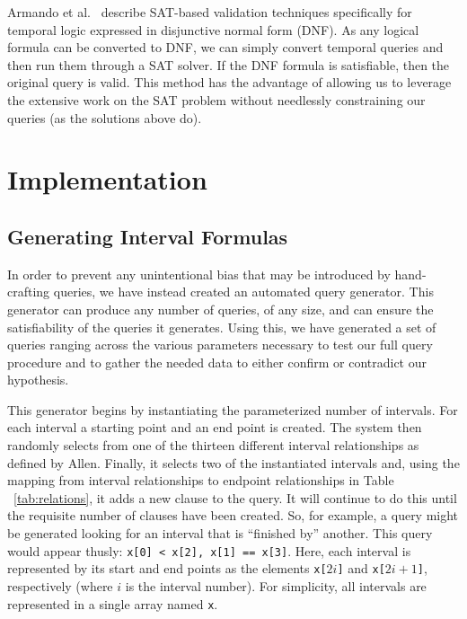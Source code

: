 \documentclass{achemso}
\begin{document}
Armando et al.~\cite{Armando:1999} describe SAT-based validation techniques specifically for temporal logic expressed in disjunctive normal form (DNF). As any logical formula can be converted to DNF, we can simply convert temporal queries and then run them through a SAT solver. If the DNF formula is satisfiable, then the original query is valid. This method has the advantage of allowing us to leverage the extensive work on the SAT problem without needlessly constraining our queries (as the solutions above do).  
\section{Implementation}
\subsection{Generating Interval Formulas}
In order to prevent any unintentional bias that may be introduced by hand-crafting queries, we have instead created an automated query generator.  This generator can produce any number of queries, of any size, and can ensure the satisfiability of the queries it generates.  Using this, we have generated a set of queries ranging across the various parameters necessary to test our full query procedure and to gather the needed data to either confirm or contradict our hypothesis.

This generator begins by instantiating the parameterized number of intervals.  For each interval a starting point and an end point is created.  The system then randomly selects from one of the thirteen different interval relationships as defined by Allen.  Finally, it selects two of the instantiated intervals and, using the mapping from interval relationships to endpoint relationships in Table ~\ref{tab:relations}, it adds a new clause to the query.  It will continue to do this until the requisite number of clauses have been created.  So, for example, a query might be generated looking for an interval that is ``finished by'' another.  This query would appear thusly:  \texttt{x[0] < x[2], x[1] == x[3]}.  Here, each interval is represented by its start and end points as the elements \texttt{x[$2i$]} and \texttt{x[$2i+1$]}, respectively (where $i$ is the interval number).  For simplicity, all intervals are represented in a single array named \texttt{x}.
\end{document}
